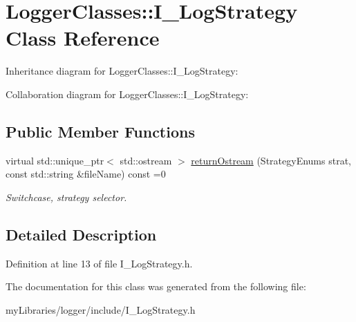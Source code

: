 \hypertarget{classLoggerClasses_1_1I__LogStrategy}{}\section{Logger\+Classes\+::I\+\_\+\+Log\+Strategy Class Reference}
\label{classLoggerClasses_1_1I__LogStrategy}


Inheritance diagram for Logger\+Classes\+::I\+\_\+\+Log\+Strategy\+:


Collaboration diagram for Logger\+Classes\+::I\+\_\+\+Log\+Strategy\+:
\subsection*{Public Member Functions}
\begin{DoxyCompactItemize}
\item 
\mbox{\label{classLoggerClasses_1_1I__LogStrategy_a1c2601ad4bd896794fa7de7fb1dbbbd8}} 
virtual std\+::unique\+\_\+ptr$<$ std\+::ostream $>$ \mbox{\hyperlink{classLoggerClasses_1_1I__LogStrategy_a1c2601ad4bd896794fa7de7fb1dbbbd8}{return\+Ostream}} (Strategy\+Enums strat, const std\+::string \&file\+Name) const =0
\begin{DoxyCompactList}\small\item\em Switchcase, strategy selector. \end{DoxyCompactList}\end{DoxyCompactItemize}


\subsection{Detailed Description}


Definition at line 13 of file I\+\_\+\+Log\+Strategy.\+h.



The documentation for this class was generated from the following file\+:\begin{DoxyCompactItemize}
\item 
my\+Libraries/logger/include/I\+\_\+\+Log\+Strategy.\+h\end{DoxyCompactItemize}
